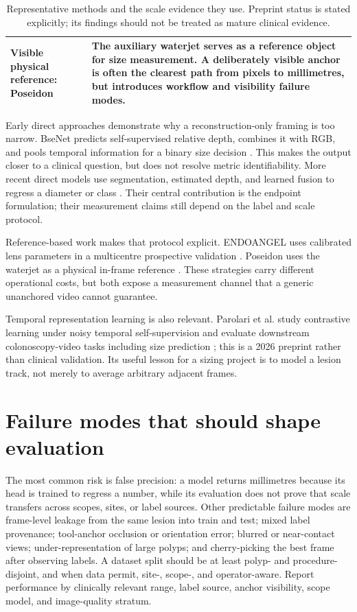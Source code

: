 \documentclass[11pt]{article}
\begin{document}
\begin{table}[t]
\begin{tabularx}{\textwidth}{@{}p{}X@{}}
Visible physical reference: Poseidon \cite{sudarevic2023poseidon} & The auxiliary waterjet serves as a reference object for size measurement. A deliberately visible anchor is often the clearest path from pixels to millimetres, but introduces workflow and visibility failure modes. \\
\bottomrule
\end{tabularx}
\caption{Representative methods and the scale evidence they use. Preprint
status is stated explicitly; its findings should not be treated as mature
clinical evidence.}
\label{tab:methods}
\end{table}

Early direct approaches demonstrate why a reconstruction-only framing is too
narrow. BseNet predicts self-supervised relative depth, combines it with RGB,
and pools temporal information for a binary size decision \cite{itoh2018bsenet}.
This makes the output closer to a clinical question, but does not resolve
metric identifiability. More recent direct models use segmentation, estimated
depth, and learned fusion to regress a diameter or class
\cite{yii2025referencefree,lawrence2026mpse}. Their central contribution is
the endpoint formulation; their measurement claims still depend on the label
and scale protocol.

Reference-based work makes that protocol explicit. ENDOANGEL uses calibrated
lens parameters in a multicentre prospective validation \cite{wang2024endoangel}.
Poseidon uses the waterjet as a physical in-frame reference
\cite{sudarevic2023poseidon}. These strategies carry different operational
costs, but both expose a measurement channel that a generic unanchored video
cannot guarantee.

Temporal representation learning is also relevant. Parolari et al. study
contrastive learning under noisy temporal self-supervision and evaluate
downstream colonoscopy-video tasks including size prediction
\cite{parolari2026temporal}; this is a 2026 preprint rather than clinical
validation. Its useful lesson for a sizing project is to model a lesion track,
not merely to average arbitrary adjacent frames.

\FloatBarrier
\section{Failure modes that should shape evaluation}

The most common risk is false precision: a model returns millimetres because
its head is trained to regress a number, while its evaluation does not prove
that scale transfers across scopes, sites, or label sources. Other predictable
failure modes are frame-level leakage from the same lesion into train and test;
mixed label provenance; tool-anchor occlusion or orientation error; blurred or
near-contact views; under-representation of large polyps; and cherry-picking
the best frame after observing labels. A dataset split should be at least
polyp- and procedure-disjoint, and when data permit, site-, scope-, and
operator-aware. Report performance by clinically relevant range, label source,
anchor visibility, scope model, and image-quality stratum.
\end{document}
